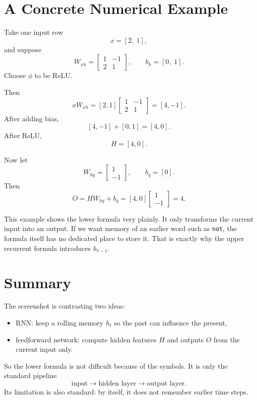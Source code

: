 \documentclass[12pt,a4paper]{article}
\begin{document}
\section{A Concrete Numerical Example}

Take one input row
\[
x = [2,\;1],
\]
and suppose
\[
W_{xh} =
\begin{bmatrix}
1 & -1\\
2 & 1
\end{bmatrix},
\qquad
b_h = [0,\;1].
\]
Choose \(\phi\) to be ReLU.

Then
\[
xW_{xh}
=
[2,1]
\begin{bmatrix}
1 & -1\\
2 & 1
\end{bmatrix}
=
[4,-1].
\]
After adding bias,
\[
[4,-1] + [0,1] = [4,0].
\]
After ReLU,
\[
H = [4,0].
\]

Now let
\[
W_{hq} =
\begin{bmatrix}
1\\
-1
\end{bmatrix},
\qquad
b_q = [0].
\]
Then
\[
O = HW_{hq} + b_q = [4,0]
\begin{bmatrix}
1\\
-1
\end{bmatrix}
= 4.
\]

This example shows the lower formula very plainly. It only transforms the current input into an output. If we want memory of an earlier word such as \texttt{not}, the formula itself has no dedicated place to store it. That is exactly why the upper recurrent formula introduces \(h_{t-1}\).

\section{Summary}

The screenshot is contrasting two ideas:
\begin{itemize}
  \item RNN: keep a rolling memory \(h_t\) so the past can influence the present,
  \item feedforward network: compute hidden features \(H\) and outputs \(O\) from the current input only.
\end{itemize}

So the lower formula is not difficult because of the symbols. It is only the standard pipeline
\[
\text{input} \rightarrow \text{hidden layer} \rightarrow \text{output layer}.
\]
Its limitation is also standard: by itself, it does not remember earlier time steps.
\end{document}
